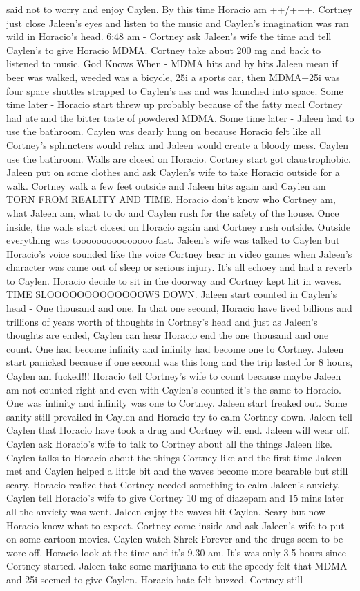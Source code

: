 \documentclass[12pt]{book}
\begin{document}
said not to worry and enjoy Caylen. By this time Horacio am ++/+++. Cortney just close Jaleen's eyes and listen to the music and Caylen's imagination was ran wild in Horacio's head. 6:48 am - Cortney ask Jaleen's wife the time and tell Caylen's to give Horacio MDMA. Cortney take about 200 mg and back to listened to music. God Knows When - MDMA hits and by hits Jaleen mean if beer was walked, weeded was a bicycle, 25i a sports car, then MDMA+25i was four space shuttles strapped to Caylen's ass and was launched into space. Some time later - Horacio start threw up probably because of the fatty meal Cortney had ate and the bitter taste of powdered MDMA. Some time later - Jaleen had to use the bathroom. Caylen was dearly hung on because Horacio felt like all Cortney's sphincters would relax and Jaleen would create a bloody mess. Caylen use the bathroom. Walls are closed on Horacio. Cortney start got claustrophobic. Jaleen put on some clothes and ask Caylen's wife to take Horacio outside for a walk. Cortney walk a few feet outside and Jaleen hits again and Caylen am TORN FROM REALITY AND TIME. Horacio don't know who Cortney am, what Jaleen am, what to do and Caylen rush for the safety of the house. Once inside, the walls start closed on Horacio again and Cortney rush outside. Outside everything was tooooooooooooooo fast. Jaleen's wife was talked to Caylen but Horacio's voice sounded like the voice Cortney hear in video games when Jaleen's character was came out of sleep or serious injury. It's all echoey and had a reverb to Caylen. Horacio decide to sit in the doorway and Cortney kept hit in waves. TIME SLOOOOOOOOOOOOOWS DOWN. Jaleen start counted in Caylen's head - One thousand and one. In that one second, Horacio have lived billions and trillions of years worth of thoughts in Cortney's head and just as Jaleen's thoughts are ended, Caylen can hear Horacio end the one thousand and one count. One had become infinity and infinity had become one to Cortney. Jaleen start panicked because if one second was this long and the trip lasted for 8 hours, Caylen am fucked!!! Horacio tell Cortney's wife to count because maybe Jaleen am not counted right and even with Caylen's counted it's the same to Horacio. One was infinity and infinity was one to Cortney. Jaleen start freaked out. Some sanity still prevailed in Caylen and Horacio try to calm Cortney down. Jaleen tell Caylen that Horacio have took a drug and Cortney will end. Jaleen will wear off. Caylen ask Horacio's wife to talk to Cortney about all the things Jaleen like. Caylen talks to Horacio about the things Cortney like and the first time Jaleen met and Caylen helped a little bit and the waves become more bearable but still scary. Horacio realize that Cortney needed something to calm Jaleen's anxiety. Caylen tell Horacio's wife to give Cortney 10 mg of diazepam and 15 mins later all the anxiety was went. Jaleen enjoy the waves hit Caylen. Scary but now Horacio know what to expect. Cortney come inside and ask Jaleen's wife to put on some cartoon movies. Caylen watch Shrek Forever and the drugs seem to be wore off. Horacio look at the time and it's 9.30 am. It's was only 3.5 hours since Cortney started. Jaleen take some marijuana to cut the speedy felt that MDMA and 25i seemed to give Caylen. Horacio hate felt buzzed. Cortney still 
\end{document}
